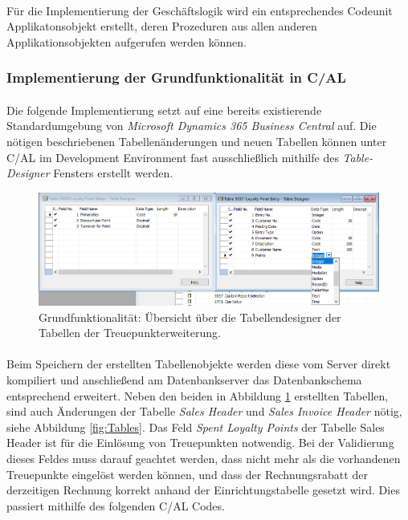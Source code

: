 \paragraph{}
Für die Implementierung der Geschäftslogik wird ein entsprechendes Codeunit Applikatonsobjekt erstellt, deren Prozeduren aus allen anderen Applikationsobjekten aufgerufen werden können.

\subsubsection{Implementierung der Grundfunktionalität in C/AL}
\paragraph{}
Die folgende Implementierung setzt auf eine bereits existierende Standardumgebung von \textit{Microsoft Dynamics 365 Business Central} auf. Die nötigen beschriebenen Tabellenänderungen und neuen Tabellen können unter C/AL im Development Environment fast ausschließlich mithilfe des \textit{Table-Designer} Fensters erstellt werden.
\begin{figure}[h]
	\centering
	\includegraphics[width=130mm]{images/CALTableDesigner}
	\caption{Grundfunktionalität: Übersicht über die Tabellendesigner der Tabellen der Treuepunkterweiterung.}
	\label{fig:Table Designer}
\end{figure}

\paragraph{}
Beim Speichern der erstellten Tabellenobjekte werden diese vom Server direkt kompiliert und anschließend am Datenbankserver das Datenbankschema entsprechend erweitert. Neben den beiden in Abbildung \ref{fig:Table Designer} erstellten Tabellen, sind auch Änderungen der Tabelle \textit{Sales Header} und \textit{Sales Invoice Header} nötig, siehe Abbildung \ref{fig:Tables}. Das Feld \textit{Spent Loyalty Points} der Tabelle {Sales Header} ist für die Einlösung von Treuepunkten notwendig. Bei der Validierung dieses Feldes muss darauf geachtet werden, dass nicht mehr als die vorhandenen Treuepunkte eingelöst werden können, und dass der Rechnungsrabatt der derzeitigen Rechnung korrekt anhand der Einrichtungstabelle gesetzt wird. Dies passiert mithilfe des folgenden C/AL Codes.

